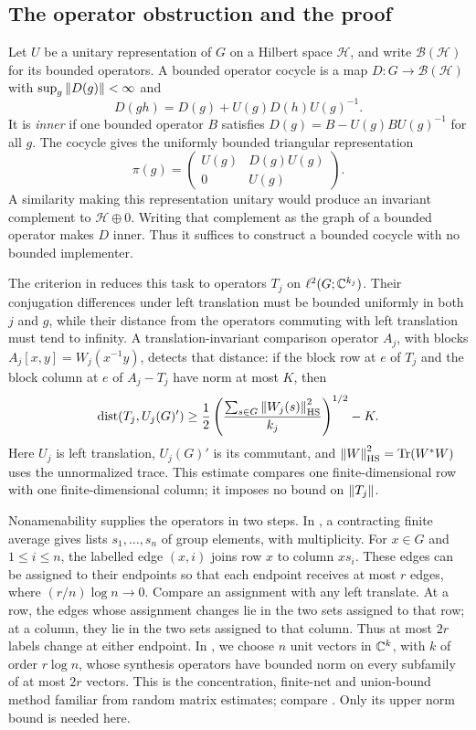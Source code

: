 \subsection*{The operator obstruction and the proof}

Let \(U\) be a unitary representation of \(G\) on a Hilbert space
\(\mathcal H\), and write \(\mathcal B(\mathcal H)\) for its bounded
operators. A bounded operator cocycle is a map
\(D:G\to\mathcal B(\mathcal H)\) with
\(\sup_g\left\lVert D(g)\right\rVert<\infty\) and
\[
 D(gh)=D(g)+U(g)D(h)U(g)^{-1}.
\]
It is \emph{inner} if one bounded operator \(B\) satisfies
\(D(g)=B-U(g)BU(g)^{-1}\) for all \(g\).
The cocycle gives the uniformly bounded triangular representation
\[
 \pi(g)=\begin{pmatrix}U(g)&D(g)U(g)\\0&U(g)\end{pmatrix}.
\]
A similarity making this representation unitary would produce an
invariant complement to \(\mathcal H\oplus0\). Writing that complement
as the graph of a bounded operator makes \(D\) inner.
Thus it suffices to construct a bounded cocycle with no bounded
implementer.

The criterion in  reduces this task to operators
\(T_j\) on \(\ell^2(G;\mathbb C^{k_j})\). Their conjugation differences under
left translation must be bounded uniformly in both \(j\) and \(g\),
while their distance from the operators commuting with left translation
must tend to infinity. A translation-invariant comparison operator
\(A_j\), with blocks \(A_j[x,y]=W_j(x^{-1}y)\), detects that distance:
if the block row at \(e\) of \(T_j\) and the block column at \(e\) of \(A_j-T_j\) have
norm at most \(K\), then
\[
 \operatorname{dist}(T_j,U_j(G)')\ge
 \frac12\left(\frac{\sum_{s\in G}\left\lVert W_j(s)\right\rVert_{\mathrm{HS}}^2}{k_j}\right)^{1/2}-K.
\]
Here \(U_j\) is left translation, \(U_j(G)'\) is its commutant, and
\(\left\lVert W\right\rVert_{\mathrm{HS}}^2=\operatorname{Tr}(W^*W)\) uses the unnormalized
trace. This estimate compares one finite-dimensional row with one
finite-dimensional column; it imposes no bound on \(\left\lVert T_j\right\rVert\).

Nonamenability supplies the operators in two steps. In
, a contracting finite average gives lists
\(s_1,\ldots,s_n\) of group elements, with multiplicity. For \(x\in G\)
and \(1\le i\le n\), the labelled edge \((x,i)\) joins row \(x\) to
column \(xs_i\). These edges can be
assigned to their endpoints so that each endpoint receives at most
\(r\) edges, where \((r/n)\log n\to0\). Compare an assignment with
any left translate. At a row, the edges whose assignment changes lie
in the two sets assigned to that row; at a column, they lie in the
two sets assigned to that column. Thus at most \(2r\) labels change
at either endpoint. In
, we choose \(n\) unit vectors in \(\mathbb C^k\), with
\(k\) of order \(r\log n\), whose synthesis operators have bounded
norm on every subfamily of at most \(2r\) vectors. This is the
concentration, finite-net and union-bound method familiar from random
matrix estimates; compare \cite[Section~5]{BDDW2008}.
Only its upper norm bound is needed here.

